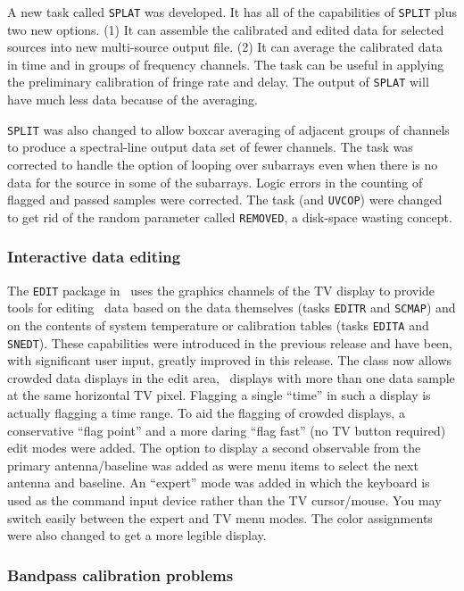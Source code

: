      A new task called {\tt SPLAT} was developed.  It has all of the
capabilities of {\tt SPLIT} plus two new options.  (1) It can assemble
the calibrated and edited data for selected sources into new
multi-source output file.  (2) It can average the calibrated data in
time and in groups of frequency channels.  The task can be useful in
applying the preliminary calibration of fringe rate and delay.  The
output of {\tt SPLAT} will have much less data because of the
averaging.

     {\tt SPLIT} was also changed to allow boxcar averaging of
adjacent groups of channels to produce a spectral-line output data set
of fewer channels.  The task was corrected to handle the option of
looping over subarrays even when there is no data for the source in
some of the subarrays.  Logic errors in the counting of flagged and
passed samples were corrected.  The task (and {\tt UVCOP}) were
changed to get rid of the random parameter called {\tt REMOVED}, a
disk-space wasting concept.

\subsubsection{Interactive data editing}

The {\tt EDIT} package in \AIPS\ uses the graphics channels of the TV
display to provide tools for editing \uv\ data based on the data
themselves (tasks {\tt EDITR} and {\tt SCMAP}) and on the contents of
system temperature or calibration tables (tasks {\tt EDITA} and
\hbox{{\tt SNEDT}}).  These capabilities were introduced in the
previous release and have been, with significant user input, greatly
improved in this release. The class now allows crowded data displays
in the edit area, \ie\ displays with more than one data sample at the
same horizontal TV pixel.  Flagging a single ``time'' in such a
display is actually flagging a time range.  To aid the flagging of
crowded displays, a conservative ``flag point'' and a more daring
``flag fast'' (no TV button required) edit modes were added.  The
option to display a second observable from the primary
antenna/baseline was added as were menu items to select the next
antenna and baseline.  An ``expert'' mode was added in which the
keyboard is used as the command input device rather than the TV
cursor/mouse.  You may switch easily between the expert and TV menu
modes.  The color assignments were also changed to get a more legible
display.

\subsubsection{Bandpass calibration problems}

